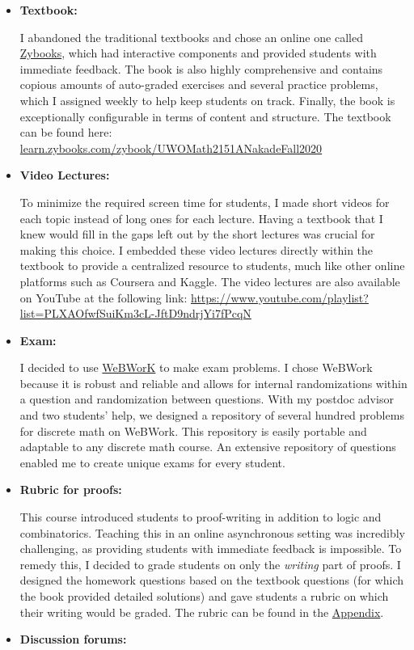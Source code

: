 \documentclass[
]{report}
\begin{document}
\begin{itemize}
\item
  \textbf{Textbook:}

  I abandoned the traditional textbooks and chose an online one called \href{https://learn.zybooks.com/zybook/UWOMath2151ANakadeFall2020}{Zybooks}, which had interactive components and provided students with immediate feedback. The book is also highly comprehensive and contains copious amounts of auto-graded exercises and several practice problems, which I assigned weekly to help keep students on track. Finally, the book is exceptionally configurable in terms of content and structure. The textbook can be found here:
  \href{https://learn.zybooks.com/zybook/UWOMath2151ANakadeFall2020}{learn.zybooks.com/zybook/UWOMath2151ANakadeFall2020}
\item
  \textbf{Video Lectures:}

  To minimize the required screen time for students, I made short videos for each topic instead of long ones for each lecture. Having a textbook that I knew would fill in the gaps left out by the short lectures was crucial for making this choice. I embedded these video lectures directly within the textbook to provide a centralized resource to students, much like other online platforms such as Coursera and Kaggle.
  The video lectures are also available on YouTube at the following link: \url{https://www.youtube.com/playlist?list=PLXAOfwfSuiKm3cL-JftD9ndrjYi7fPcqN}
\item
  \textbf{Exam:}

  I decided to use \href{https://webwork.maa.org}{WeBWorK} to make exam problems.
  I chose WeBWork because it is robust and reliable and allows for internal randomizations within a question and randomization between questions. With my postdoc advisor and two students' help, we designed a repository of several hundred problems for discrete math on WeBWork. This repository is easily portable and adaptable to any discrete math course. An extensive repository of questions enabled me to create unique exams for every student.
\item
  \textbf{Rubric for proofs:}

  This course introduced students to proof-writing in addition to logic and combinatorics. Teaching this in an online asynchronous setting was incredibly challenging, as providing students with immediate feedback is impossible. To remedy this, I decided to grade students on only the \emph{writing} part of proofs.
  I designed the homework questions based on the textbook questions (for which the book provided detailed solutions) and gave students a rubric on which their writing would be graded. The rubric can be found in the \protect\hyperlink{rubric-for-grading-proofs}{Appendix}.
\item
  \textbf{Discussion forums:}


\end{itemize}
\end{document}
